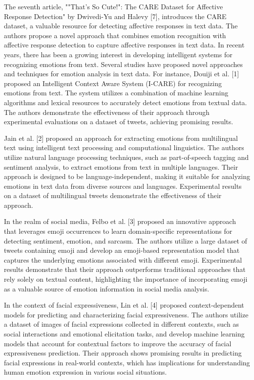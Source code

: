 \documentclass[conference]{IEEEtran}
\begin{document}
The seventh article, ""That's So Cute!": The CARE Dataset for Affective Response Detection" by Dwivedi-Yu and Halevy [7], introduces the CARE dataset, a valuable resource for detecting affective responses in text data. The authors propose a novel approach that combines emotion recognition with affective response detection to capture affective responses in text data.
In recent years, there has been a growing interest in developing intelligent systems for recognizing emotions from text. Several studies have proposed novel approaches and techniques for emotion analysis in text data. For instance, Douiji et al. [1] proposed an Intelligent Context Aware System (I-CARE) for recognizing emotions from text. The system utilizes a combination of machine learning algorithms and lexical resources to accurately detect emotions from textual data. The authors demonstrate the effectiveness of their approach through experimental evaluations on a dataset of tweets, achieving promising results.

Jain et al. [2] proposed an approach for extracting emotions from multilingual text using intelligent text processing and computational linguistics. The authors utilize natural language processing techniques, such as part-of-speech tagging and sentiment analysis, to extract emotions from text in multiple languages. Their approach is designed to be language-independent, making it suitable for analyzing emotions in text data from diverse sources and languages. Experimental results on a dataset of multilingual tweets demonstrate the effectiveness of their approach.

In the realm of social media, Felbo et al. [3] proposed an innovative approach that leverages emoji occurrences to learn domain-specific representations for detecting sentiment, emotion, and sarcasm. The authors utilize a large dataset of tweets containing emoji and develop an emoji-based representation model that captures the underlying emotions associated with different emoji. Experimental results demonstrate that their approach outperforms traditional approaches that rely solely on textual content, highlighting the importance of incorporating emoji as a valuable source of emotion information in social media analysis.

In the context of facial expressiveness, Lin et al. [4] proposed context-dependent models for predicting and characterizing facial expressiveness. The authors utilize a dataset of images of facial expressions collected in different contexts, such as social interactions and emotional elicitation tasks, and develop machine learning models that account for contextual factors to improve the accuracy of facial expressiveness prediction. Their approach shows promising results in predicting facial expressions in real-world contexts, which has implications for understanding human emotion expression in various social situations.
\end{document}
